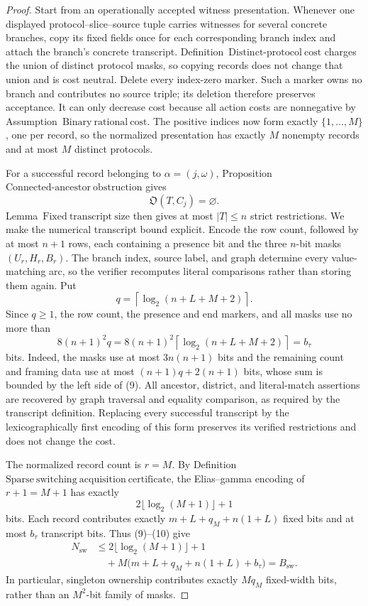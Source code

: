 \documentclass{article}
\begin{document}
\begin{proof}
Start from an operationally accepted witness presentation.  Whenever one displayed protocol--slice--source tuple carries witnesses for several concrete branches, copy its fixed fields once for each corresponding branch index and attach the branch's concrete transcript.  Definition~\(\mathrm{Distinct\mbox{-}protocol\ cost}\) charges the union of distinct protocol masks, so copying records does not change that union and is cost neutral.  Delete every index-zero marker.  Such a marker owns no branch and contributes no source triple; its deletion therefore preserves acceptance.  It can only decrease cost because all action costs are nonnegative by Assumption~\(\mathrm{Binary\ rational\ cost}\).  The positive indices now form exactly \(\{1,\ldots,M\}\), one per record, so the normalized presentation has exactly \(M\) nonempty records and at most \(M\) distinct protocols.

For a successful record belonging to \(\alpha=(j,\omega)\), Proposition~\(\mathrm{Connected\mbox{-}ancestor\ obstruction}\) gives
\[
 \mathfrak O(T,C_j)=\varnothing.
 \tag{7}
\]
Lemma~\(\mathrm{Fixed\ transcript\ size}\) then gives at most \(|T|\leq n\) strict restrictions.  We make the numerical transcript bound explicit.  Encode the row count, followed by at most \(n+1\) rows, each containing a presence bit and the three \(n\)-bit masks \((U_r,H_r,B_r)\).  The branch index, source label, and graph determine every value-matching arc, so the verifier recomputes literal comparisons rather than storing them again.  Put
\[
 q=\left\lceil\log_2(n+L+M+2)\right\rceil.
 \tag{8}
\]
Since \(q\geq1\), the row count, the presence and end markers, and all masks use no more than
\[
 8(n+1)^2q
 =8(n+1)^2\left\lceil\log_2(n+L+M+2)\right\rceil
 =b_{\tau}
 \tag{9}
\]
bits.  Indeed, the masks use at most \(3n(n+1)\) bits and the remaining count and framing data use at most \((n+1)q+2(n+1)\) bits, whose sum is bounded by the left side of (9).  All ancestor, district, and literal-match assertions are recovered by graph traversal and equality comparison, as required by the transcript definition.  Replacing every successful transcript by the lexicographically first encoding of this form preserves its verified restrictions and does not change the cost.

The normalized record count is \(r=M\).  By Definition~\(\mathrm{Sparse\ switching\ acquisition\ certificate}\), the Elias--gamma encoding of \(r+1=M+1\) has exactly
\[
 2\lfloor\log_2(M+1)\rfloor+1
 \tag{10}
\]
bits.  Each record contributes exactly
\(m+L+q_M+n(1+L)\) fixed bits and at most \(b_{\tau}\) transcript bits.  Thus (9)--(10) give
\[
\begin{aligned}
 N_{\mathrm{sw}}
 &\leq 2\lfloor\log_2(M+1)\rfloor+1\\
 &\quad+M\bigl(m+L+q_M+n(1+L)+b_{\tau}\bigr)
 =B_{\mathrm{sw}}.
\end{aligned}
\tag{11}
\]
In particular, singleton ownership contributes exactly \(Mq_M\) fixed-width bits, rather than an \(M^2\)-bit family of masks.


\end{proof}
\end{document}
